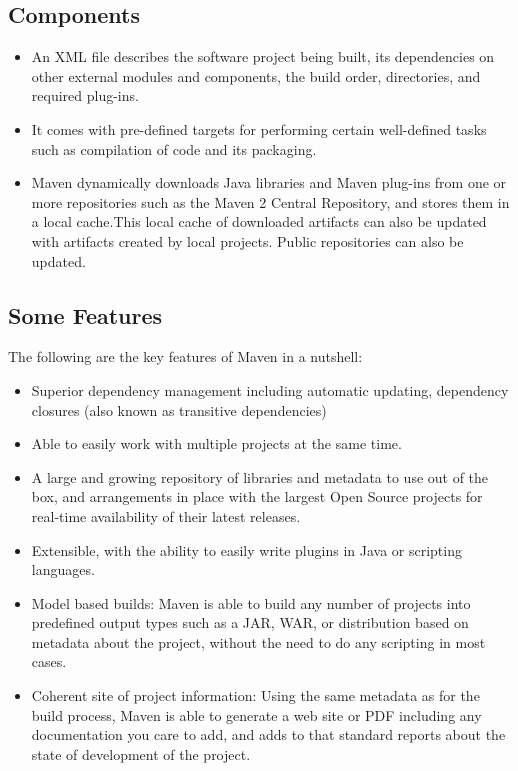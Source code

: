 \subsection{Components}

\begin{itemize}

\item An XML file describes the software project being built, its dependencies on other external modules and components, the build order, directories, and required plug-ins. 

\item It comes with pre-defined targets for performing certain well-defined tasks such as compilation of code and its packaging. 

\item Maven dynamically downloads Java libraries and Maven plug-ins from one or more repositories such as the Maven 2 Central Repository, and stores them in a local cache.This local cache of downloaded artifacts can also be updated with artifacts created by local projects. Public repositories can also be updated.

\end{itemize}

\subsection{Some Features}

The following are the key features of Maven in a nutshell: 

\begin{itemize}
\item Superior dependency management including automatic updating, dependency closures (also known as transitive dependencies)

\item Able to easily work with multiple projects at the same time.

\item A large and growing repository of libraries and metadata to use out of the box, and arrangements in place with the largest Open Source projects for real-time availability of their latest releases.

\item Extensible, with the ability to easily write plugins in Java or scripting languages.
\item Model based builds: Maven is able to build any number of projects into predefined output types such as a JAR, WAR, or distribution based on metadata about the project, without the need to do any scripting in most cases.

\item Coherent site of project information: Using the same metadata as for the build process, Maven is able to generate a web site or PDF including any documentation you care to add, and adds to that standard reports about the state of development of the project.

\end{itemize}

